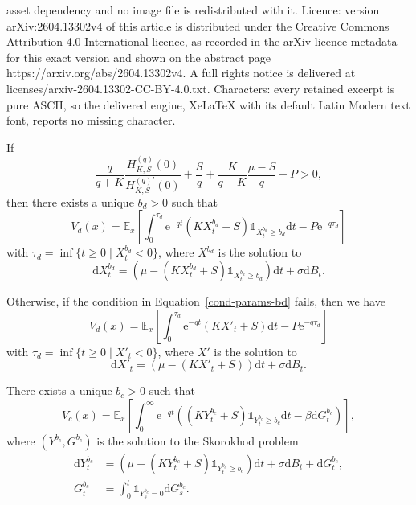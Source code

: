 \documentclass[10pt,a4paper]{amsart}
\newcommand{\E}{\mathbb{E}}
\newcommand{\Hqprime}{H^{(q) \prime}_{K,S}}
\newcommand{\Hq}{H^{(q)}_{K,S}}
\newcommand{\diff}{\mathrm{d}}
\newcommand{\ettaz}{\frac{S}{q} + \frac{K}{q+K}\frac{\mu - S}{q}}
\newcommand{\e}{\mathrm{e}}
\newcommand{\ind}{\mathds{1}}
\renewcommand{\geq}{\geqslant}
\begin{document}
asset dependency and no image file is redistributed with it. Licence: version arXiv:2604.13302v4 of this article is distributed under the Creative Commons Attribution 4.0 International licence, as recorded in the arXiv licence metadata for this exact version and shown on the abstract page https://arxiv.org/abs/2604.13302v4. A full rights notice is delivered at licenses/arxiv-2604.13302-CC-BY-4.0.txt. Characters: every retained excerpt is pure ASCII, so the delivered engine, XeLaTeX with its default Latin Modern text font, reports no missing character.
\begin{theorem}\label{thm:sol-Jd}
    If
    \begin{equation}\label{cond-params-bd}
        \frac{q}{q+K}\frac{\Hq(0)}{\Hqprime(0)} + \ettaz + P > 0,
    \end{equation}
    then there exists a unique $b_d>0$ such that
    \begin{equation}\label{Vd-proba}
        V_d(x) = \E_x \left[ \int_0^{\tau_d} \mathrm{e}^{-qt} (KX^{b_d}_t +S) \ind_{X^{b_d}_t \geq b_d} \diff t - P\e^{-q\tau_d}\right]        
    \end{equation}
    with $\tau_d = \inf\{t\geq 0\mid X^{b_d}_t < 0\}$, where $X^{b_d}$ is the solution to
    \begin{equation}
        \diff X^{b_d}_t = \left(\mu - (K X^{b_d}_t + S) \ind_{X^{b_d}_t \geq b_d} \right) \diff t + \sigma \diff B_t .
    \end{equation}
    
    Otherwise, if the condition in Equation~\eqref{cond-params-bd} fails, then we have
    \begin{equation}\label{Vd-bd0-proba}
        V_d(x) = \E_x \left[ \int_0^{\tau_d} \mathrm{e}^{-qt} (KX'_t +S) \diff t - P\e^{-q\tau_d}\right]
    \end{equation}
    with $\tau_d = \inf\{t\geq 0\mid X'_t < 0\}$, where $X'$ is the solution to
    \begin{equation}
        \diff X'_t = \left(\mu - (K X'_t + S) \right) \diff t + \sigma \diff B_t .
    \end{equation}
\end{theorem}

\begin{theorem}\label{thm:sol-Jc}
    There exists a unique $b_c>0$ such that
    \begin{equation}\label{Vc-proba}
        V_c(x) = \E_x \left[\int_0^\infty \e^{-qt}\left((K Y^{b_c}_t + S)\ind_{Y^{b_c}_t\geq b_c} \diff t - \beta\diff G^{b_c}_t\right)\right],        
    \end{equation}
    where $(Y^{b_c},G^{b_c})$ is the solution to the Skorokhod problem
    \begin{align*}
        \diff Y^{b_c}_t &= \left(\mu - (K Y^{b_c}_t + S)\ind_{Y^{b_c}_t\geq b_c}\right)\diff t + \sigma \diff B_t + \diff G^{b_c}_t ,\\
            G^{b_c}_t &= \int_0^t \ind_{Y^{b_c}_s = 0} \diff G^{b_c}_s .
    \end{align*}
\end{theorem}
\end{document}
